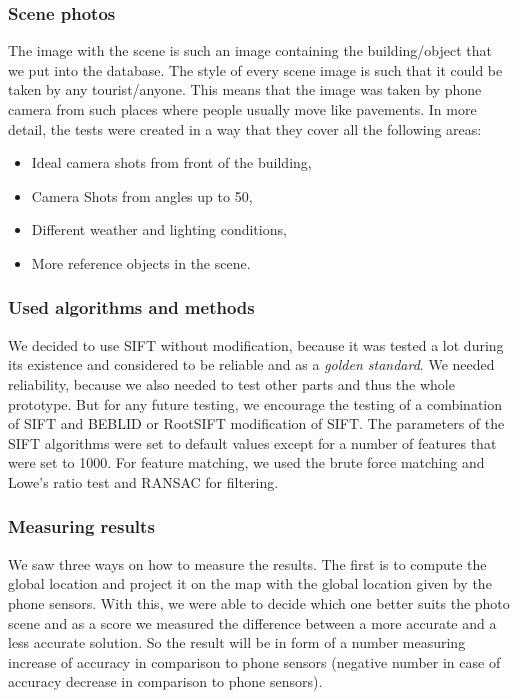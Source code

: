 \documentclass[thesis=B,english]{FITthesis}[2019/12/23]
\begin{document}
            \subsubsection*{Scene photos}
                The image with the scene is such an image containing the building/object that we put into the database. The style of every scene image is such that it could be taken by any tourist/anyone. This means that the image was taken by phone camera from such places where people usually move like pavements. In more detail, the tests were created in a way that they cover all the following areas:
                \begin{itemize}
                    \item Ideal camera shots from front of the building,
                    \item Camera Shots from angles up to 50\degree,
                    \item Different weather and lighting conditions,
                    \item More reference objects in the scene.
                \end{itemize}
            
            \subsubsection*{Used algorithms and methods}
                We decided to use SIFT without modification, because it was tested a lot during its existence and considered to be reliable and as a \textit{golden standard}. We needed reliability, because we also needed to test other parts and thus the whole prototype. But for any future testing, we encourage the testing of a combination of SIFT and BEBLID or RootSIFT modification of SIFT. The parameters of the SIFT algorithms were set to default values except for a number of features that were set to 1000. For feature matching, we used the brute force matching and Lowe's ratio test and RANSAC for filtering.
            
            \subsubsection*{Measuring results}
                We saw three ways on how to measure the results. The first is to compute the global location and project it on the map with the global location given by the phone sensors. With this, we were able to decide which one better suits the photo scene and as a score we measured the difference between a more accurate and a less accurate solution. So the result will be in form of a number measuring increase of accuracy in comparison to phone sensors (negative number in case of accuracy decrease in comparison to phone sensors).
                
\end{document}
